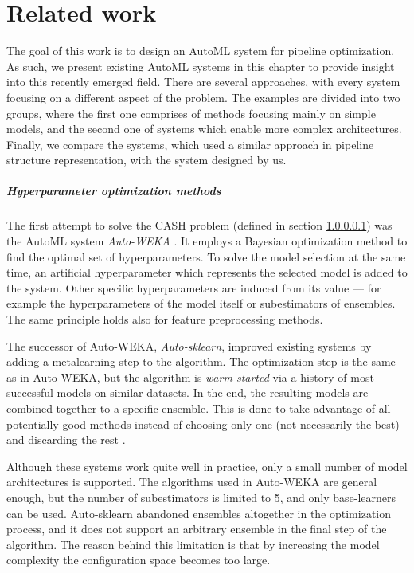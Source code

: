 \chapter{Related work} \label{ch2:related}
The goal of this work is to design an AutoML system for pipeline optimization.
As such, we present existing AutoML systems in this chapter to provide insight
into this recently emerged field. There are several approaches, with every system
focusing on a different aspect of the problem. The examples are divided into
two groups, where the first one comprises of methods focusing mainly on simple
models, and the second one of systems which enable more complex architectures.
Finally, we compare the systems, which used a similar approach in
pipeline structure representation, with the system designed by us.

\paragraph{Hyperparameter optimization methods} \label{CASH}
The first attempt to solve the CASH problem (defined in section \ref{CASH})
was the AutoML system \emph{Auto-WEKA}
\citep{DBLP:journals/corr/abs-1208-3719}. It employs a Bayesian optimization
method to find the optimal set of hyperparameters. To solve the model selection
at the same time, an artificial hyperparameter which represents the selected
model is added to the system. Other specific hyperparameters are induced from its
value --- for example the hyperparameters of the model itself or subestimators of
ensembles. The same principle holds also for feature preprocessing methods.

The successor of Auto-WEKA, \emph{Auto-sklearn}, improved existing systems by
adding a metalearning step to the algorithm. The optimization step is the same
as in Auto-WEKA, but the algorithm is \emph{warm-started} via a history of most
successful models on similar datasets. In the end, the resulting models are
combined together to a specific ensemble. This is done to take advantage of all
potentially good methods instead of choosing only one (not necessarily the best)
and discarding the rest \citep{Feurer:2015:ERA:2969442.2969547}.

Although these systems work quite well in practice, only a small number of model
architectures is supported. The algorithms used in Auto-WEKA are general
enough, but the number of subestimators is limited to 5, and only base-learners can
be used. Auto-sklearn abandoned ensembles altogether in the optimization process,
and it does not support an arbitrary ensemble in the final step of the algorithm.
The reason behind this limitation is that by increasing the model complexity the
configuration space becomes too large.

